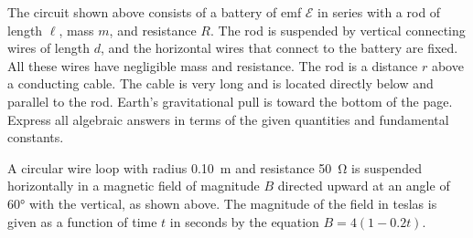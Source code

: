 \documentclass{../../../oss-classkick-exam}
\begin{document}
\begin{questions}
  \question The circuit shown above consists of a battery of emf $\mathcal{E}$
  in series with a rod of length $\ell$, mass $m$, and resistance $R$. The rod
  is suspended by vertical connecting wires of length $d$, and the horizontal
  wires that connect to the battery are fixed. All these wires have negligible
  mass and resistance. The rod is a distance $r$ above a conducting cable. The
  cable is very long and is located directly below and parallel to the rod.
  Earth's gravitational pull is toward the bottom of the page. Express all
  algebraic answers in terms of the given quantities and fundamental constants.
  \newpage
  
  \question A circular wire loop with radius \SI{.10}{\metre} and resistance
  \SI{50}{\ohm} is suspended horizontally in a magnetic field of magnitude $B$
  directed upward at an angle of \ang{60} with the vertical, as shown above.
  The magnitude of the field in teslas is given as a function of time $t$ in
  seconds by the equation $B=4(1-0.2t)$.
  \begin{parts}

\end{parts}
\end{questions}
\end{document}
